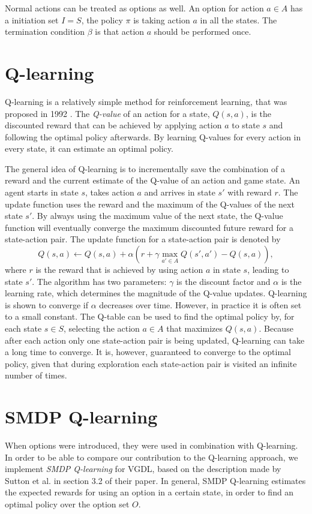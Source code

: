 Normal actions can be treated as options as
well.  An option for action $a \in A$ has a initiation set $I = S$, the policy
$\pi$ is taking action $a$ in all the states.  The termination condition $\beta$
is that action $a$ should be performed once. 

\section{Q-learning}
\label{subsec:qlearning}
Q-learning is a relatively simple method for reinforcement learning,
that was proposed in 1992 \cite{watkins1992q}. The \emph{Q-value} of an action
for a state, $Q(s, a)$, is the discounted reward that can be achieved by
applying action $a$ to state $s$ and following the optimal policy afterwards. By
learning Q-values for every action in every state, it can estimate an optimal
policy. 

The general idea of Q-learning is to incrementally save the combination of a
reward and the current estimate of the Q-value of an action and game state.
An agent starts in state $s$, takes action $a$ and arrives in state $s'$ with
reward $r$.  The update function uses the reward and the maximum of the Q-values of the
next state $s'$. By always using the maximum value of the next state, the Q-value
function will eventually converge the maximum discounted future reward for a
state-action pair. The update function for a state-action pair is denoted by 
\begin{equation}
	\label{eq:qlearning}
	Q(s, a) \gets Q(s, a) + \alpha \left(r + \gamma \max_{a' \in A} Q(s', a') - Q(s, a)\right),
\end{equation}
where $r$ is the reward that is achieved by using action $a$ in state $s$,
leading to state $s'$. The algorithm has two parameters: $\gamma$ is the
discount factor and $\alpha$ is the learning rate, which determines the
magnitude of the Q-value updates.  Q-learning is shown to converge if $\alpha$
decreases over time. However, in practice it is often set to a small constant.
The Q-table can be used to find the optimal policy by, for each state $s \in S$,
selecting the action $a \in A$ that maximizes $Q(s, a)$. Because after each action
only one state-action pair is being updated, Q-learning can take a long time to
converge. It is, however, guaranteed to converge to the optimal policy, given that
during exploration each state-action pair is visited an infinite number of times.

\section{SMDP Q-learning}
\label{subsec:smdp-qlearning}
When options were introduced, they were used in combination with Q-learning. In
order to be able to compare our contribution to the Q-learning approach, we
implement \emph{SMDP Q-learning} \cite{sutton1999between} for VGDL, based on the
description made by Sutton et al. in section 3.2 of their paper. In general,
SMDP Q-learning estimates the expected rewards for using an option in a certain
state, in order to find an optimal policy over the option set $O$.


